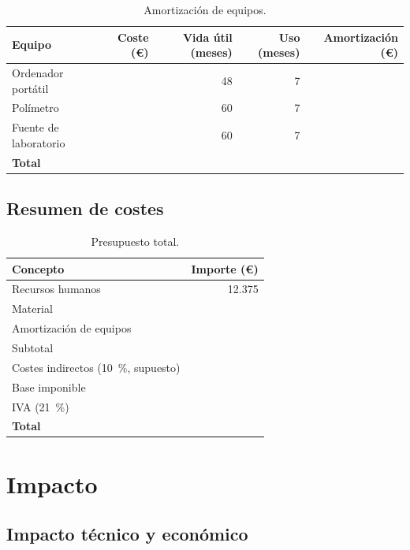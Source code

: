 \begin{table}[H]
\centering
\caption{Amortización de equipos.}
\label{tab:amortizacion}
\begin{tabular}{@{}lrrrr@{}}
\toprule
Equipo & Coste (€) & Vida útil (meses) & Uso (meses) & Amortización (€) \\
\midrule
Ordenador portátil & \completar{} & 48 & 7 & \\
Polímetro & \completar{} & 60 & 7 & \\
Fuente de laboratorio & \completar{} & 60 & 7 & \\
\midrule
\textbf{Total} & & & & \completar{} \\
\bottomrule
\end{tabular}
\end{table}

\subsection{Resumen de costes}

\begin{table}[H]
\centering
\caption{Presupuesto total.}
\label{tab:presupuesto}
\begin{tabular}{@{}lr@{}}
\toprule
Concepto & Importe (€) \\
\midrule
Recursos humanos & 12.375 \\
Material & \completar{} \\
Amortización de equipos & \completar{} \\
\midrule
Subtotal & \completar{} \\
Costes indirectos (\SI{10}{\percent}, supuesto) & \completar{} \\
\midrule
Base imponible & \completar{} \\
IVA (\SI{21}{\percent}) & \completar{} \\
\midrule
\textbf{Total} & \completar{} \\
\bottomrule
\end{tabular}
\end{table}

\section{Impacto}

\subsection{Impacto técnico y económico}

